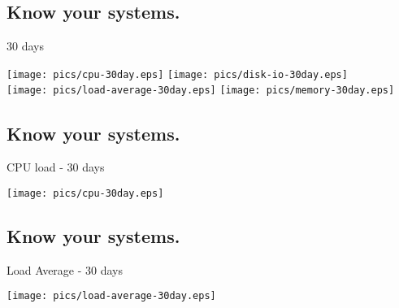 \documentclass[xga]{xdvislides}
\begin{document}
\subsection{Know your systems.}
30 days
\begin{center}
	\texttt{[image: pics/cpu-30day.eps]}
	\texttt{[image: pics/disk-io-30day.eps]} \\
	\texttt{[image: pics/load-average-30day.eps]}
	\texttt{[image: pics/memory-30day.eps]} \\
\end{center}


\subsection{Know your systems.}
CPU load - 30 days
\begin{center}
	\texttt{[image: pics/cpu-30day.eps]}
\end{center}

%
\subsection{Know your systems.}
Load Average - 30 days
\begin{center}
	\texttt{[image: pics/load-average-30day.eps]}
\end{center}


%
%
\end{document}
